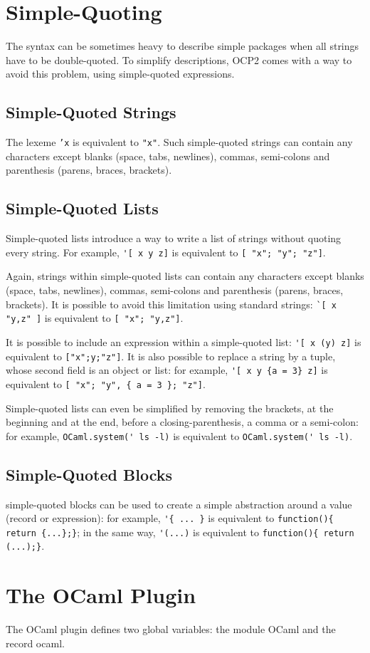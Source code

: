 \section{Simple-Quoting}

The syntax can be sometimes heavy to describe simple packages when all
strings have to be double-quoted. To simplify descriptions, OCP2 comes
with a way to avoid this problem, using simple-quoted expressions.

\subsection{Simple-Quoted Strings}

The lexeme {\tt 'x} is equivalent to {\tt "x"}. Such simple-quoted
strings can contain any characters except blanks (space, tabs,
newlines), commas, semi-colons and parenthesis (parens, braces,
brackets).

\subsection{Simple-Quoted Lists}

Simple-quoted lists introduce a way to write a list of strings without
quoting every string. For example, \verb|'[ x y z]| is equivalent to
\verb|[ "x"; "y"; "z"]|.

Again, strings within simple-quoted lists can contain any characters
except blanks (space, tabs, newlines), commas, semi-colons and
parenthesis (parens, braces, brackets). It is possible to avoid this
limitation using standard strings: \verb|`[ x "y,z" ]| is equivalent to
\verb|[ "x"; "y,z"]|.

It is possible to include an expression within a simple-quoted list:
\verb|'[ x (y) z]| is equivalent to \verb|["x";y;"z"]|. It is also
possible to replace a string by a tuple, whose second field is an object
or list: for example, \verb|'[ x y {a = 3} z]| is equivalent to
\verb|[ "x"; "y", { a = 3 }; "z"]|.

Simple-quoted lists can even be simplified by removing the brackets,
at the beginning and at the end, before a closing-parenthesis, a comma
or a semi-colon: for example, \verb|OCaml.system(' ls -l)| is equivalent
to \verb|OCaml.system(' ls -l)|.

\subsection{Simple-Quoted Blocks}

simple-quoted blocks can be used to create a simple abstraction around a value
(record or expression): for
example, \verb|'{ ... }| is equivalent to
\verb|function(){ return {...};}|;
in the same way, \verb|'(...)| is equivalent to
\verb|function(){ return (...);}|.

\section{The OCaml Plugin}

The OCaml plugin defines two global variables: the module {\sf OCaml} and
the record {\sf ocaml}.
